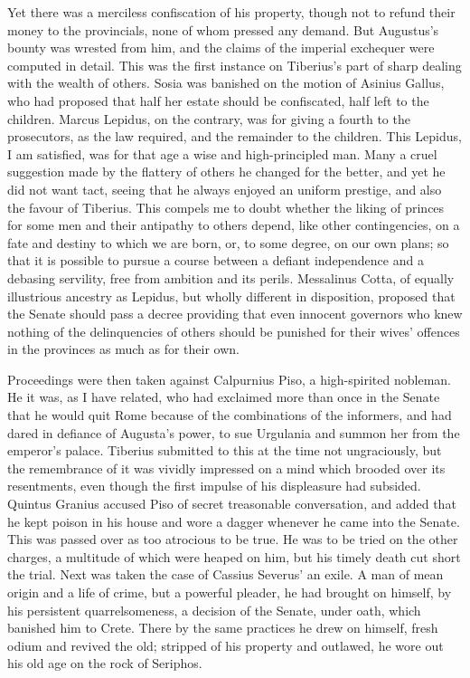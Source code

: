 Yet there was a merciless confiscation of his property, though not to refund their money to the provincials, none of whom pressed any demand. But Augustus's bounty was wrested from him, and the claims of the imperial exchequer were computed in detail. This was the first instance on Tiberius's part of sharp dealing with the wealth of others. Sosia was banished on the motion of Asinius Gallus, who had proposed that half her estate should be confiscated, half left to the children. Marcus Lepidus, on the contrary, was for giving a fourth to the prosecutors, as the law required, and the remainder to the children. This Lepidus, I am satisfied, was for that age a wise and high-principled man. Many a cruel suggestion made by the flattery of others he changed for the better, and yet he did not want tact, seeing that he always enjoyed an uniform prestige, and also the favour of Tiberius. This compels me to doubt whether the liking of princes for some men and their antipathy to others depend, like other contingencies, on a fate and destiny to which we are born, or, to some degree, on our own plans; so that it is possible to pursue a course between a defiant independence and a debasing servility, free from ambition and its perils. Messalinus Cotta, of equally illustrious ancestry as Lepidus, but wholly different in disposition, proposed that the Senate should pass a decree providing that even innocent governors who knew nothing of the delinquencies of others should be punished for their wives' offences in the provinces as much as for their own.


Proceedings were then taken against Calpurnius Piso, a high-spirited nobleman. He it was, as I have related, who had exclaimed more than once in the Senate that he would quit Rome because of the combinations of the informers, and had dared in defiance of Augusta's power, to sue Urgulania and summon her from the emperor's palace. Tiberius submitted to this at the time not ungraciously, but the remembrance of it was vividly impressed on a mind which brooded over its resentments, even though the first impulse of his displeasure had subsided. Quintus Granius accused Piso of secret treasonable conversation, and added that he kept poison in his house and wore a dagger whenever he came into the Senate. This was passed over as too atrocious to be true. He was to be tried on the other charges, a multitude of which were heaped on him, but his timely death cut short the trial. Next was taken the case of Cassius Severus' an exile. A man of mean origin and a life of crime, but a powerful pleader, he had brought on himself, by his persistent quarrelsomeness, a decision of the Senate, under oath, which banished him to Crete. There by the same practices he drew on himself, fresh odium and revived the old; stripped of his property and outlawed, he wore out his old age on the rock of Seriphos.

